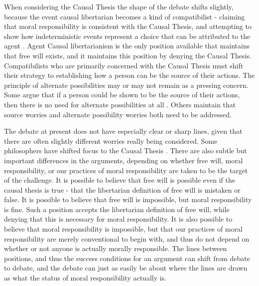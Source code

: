 \documentclass[phd,12pt,oneside,paper=letterpaper]{ubcthesis}
\begin{document}
When considering the Causal Thesis the shape of the debate shifts slightly, because the event causal libertarian becomes a kind of compatibilist - claiming that moral responsibility is consistent with the Causal Thesis, and attempting to show how indeterministic events represent a choice that can be attributed to the agent \citep{kane1999, balaguer2004}. Agent Causal libertarianism is the only position available that maintains that free will exists, and it maintains this position by denying the Causal Thesis. Compatibilists who are primarily concerned with the Causal Thesis must shift their strategy to establishing how a person can be the source of their actions. The principle of alternate possibilities may or may not remain as a pressing concern. Some argue that if a person could be shown to be the source of their actions, then there is no need for alternate possibilities at all \citep{pereboom2001}. Others maintain that source worries and alternate possibility worries both need to be addressed. 

The debate at present does not have especially clear or sharp lines, given that there are often slightly different worries really being considered. Some philosophers have shifted focus to the Causal Thesis \citep{strawsong2010, wallace1994}. There are also subtle but important differences in the arguments, depending on whether free will, moral responsibility, or our practices of moral responsibility are taken to be the target of the challenge. It is possible to believe that free will is possible even if the causal thesis is true - that the libertarian definition of free will is mistaken or false. It is possible to believe that free will is impossible, but moral responsibility is fine. Such a position accepts the libertarian definition of free will, while denying that this is necessary for moral responsibility. It is also possible to believe that moral responsibility is impossible, but that our practices of moral responsibility are merely conventional to begin with, and thus do not depend on whether or not anyone is actually morally responsible. The lines between positions, and thus the success conditions for an argument can shift from debate to debate, and the debate can just as easily be about where the lines are drawn as what the status of moral responsibility actually is.
\end{document}
